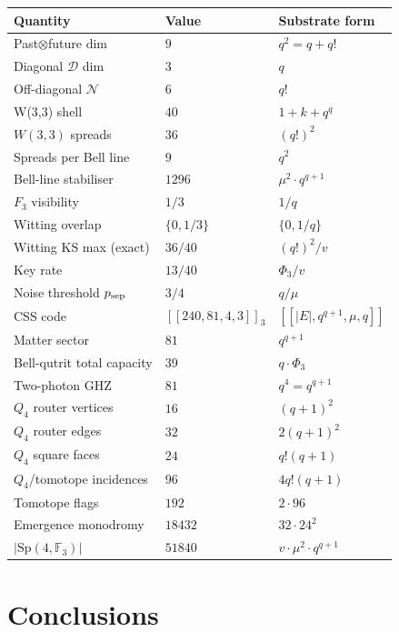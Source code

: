 \documentclass[11pt]{article}
\newcommand{\Sp}{\mathrm{Sp}}
\newcommand{\GF}[1]{\mathbb{F}_{#1}}
\begin{document}
\begin{center}\small\begin{tabular}{lll}
\toprule
\textbf{Quantity} & \textbf{Value} & \textbf{Substrate form} \\
\midrule
Past$\otimes$future dim    & $9$    & $q^2 = q + q!$ \\
Diagonal $\mathcal D$ dim   & $3$    & $q$ \\
Off-diagonal $\mathcal N$  & $6$    & $q!$ \\
W(3,3) shell               & $40$   & $1 + k + q^q$ \\
$W(3,3)$ spreads            & $36$   & $(q!)^2$ \\
Spreads per Bell line       & $9$    & $q^2$ \\
Bell-line stabiliser        & $1296$ & $\mu^2 \cdot q^{q+1}$ \\
$F_3$ visibility            & $1/3$  & $1/q$ \\
Witting overlap            & $\{0, 1/3\}$ & $\{0, 1/q\}$ \\
Witting KS max (exact)     & $36/40$ & $(q!)^2/v$ \\
Key rate                   & $13/40$ & $\Phi_3/v$ \\
Noise threshold $p_{\rm sep}$ & $3/4$ & $q/\mu$ \\
CSS code                   & $[[240,81,4,3]]_3$ & $[[|E|, q^{q+1}, \mu, q]]$ \\
Matter sector               & $81$    & $q^{q+1}$ \\
Bell-qutrit total capacity  & $39$    & $q\cdot\Phi_3$ \\
Two-photon GHZ              & $81$    & $q^4 = q^{q+1}$ \\
$Q_4$ router vertices       & $16$    & $(q+1)^2$ \\
$Q_4$ router edges          & $32$    & $2(q+1)^2$ \\
$Q_4$ square faces          & $24$    & $q!(q+1)$ \\
$Q_4$/tomotope incidences   & $96$    & $4q!(q+1)$ \\
Tomotope flags              & $192$   & $2\cdot96$ \\
Emergence monodromy         & $18432$ & $32\cdot24^2$ \\
$|\Sp(4,\GF{3})|$           & $51840$ & $v\cdot\mu^2\cdot q^{q+1}$ \\
\bottomrule
\end{tabular}\end{center}

\section{Conclusions}
\end{document}
